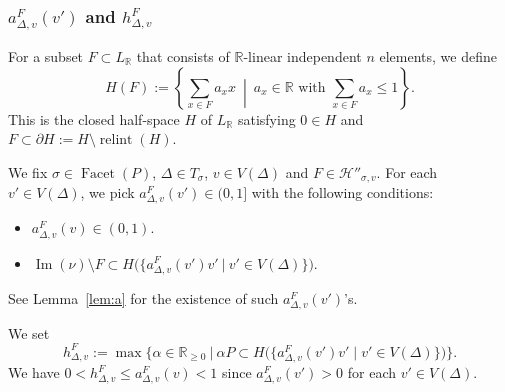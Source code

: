 \subsubsection{$a^{F} _{\Delta, v} (v')$ and $h^F_{\Delta, v}$}\label{subsubsection:ah}
\begin{defn}\label{defi:ah}
For a subset $F \subset L_{\mathbb{R}}$ that consists of $\mathbb{R}$-linear independent $n$ elements, 
we define 
\[
H(F) := \left \{ \sum _{x \in F} a_x x \ \middle | \ \text{$a_x \in \mathbb{R}$ with $\sum_{x \in F} a_x \le 1$} \right \}. 
\]
This is the closed half-space $H$ of $L_{\mathbb{R}}$ satisfying $0 \in H$ and $F \subset \partial H := H \setminus \operatorname{relint}(H)$. 
\end{defn}

We fix $\sigma \in \operatorname{Facet}(P)$, $\Delta \in T_{\sigma}$, $v \in V(\Delta)$ and $F \in \mathcal{H}'' _{\sigma, v}$. 
For each $v' \in V(\Delta)$, 
we pick $a^{F} _{\Delta, v} (v') \in (0,1]$ with the following conditions: 
\begin{itemize}
\item[(A1)] 
$a^{F} _{\Delta, v} (v) \in (0,1)$. 

\item[(A2)]
$\operatorname{Im}(\nu) \setminus F \subset H \bigl( \bigl \{ a^{F} _{\Delta, v} (v') v' \ \big | \  v' \in V(\Delta) \bigr \} \bigr)$. 
\end{itemize}
See Lemma~\ref{lem:a} for the existence of such $a^{F} _{\Delta, v} (v')$'s. 

We set
\[\tag{H}
h^F_{\Delta, v} := \max \bigl \{ \alpha \in \mathbb{R}_{\ge 0} \ \big | \ 
\alpha P \subset 
H \bigl( \bigl \{ a^{F} _{\Delta, v} (v') v' \mid v' \in V(\Delta) \bigr \} \bigr) \bigr \}. 
\]
We have $0 < h^F_{\Delta, v} \le a^{F} _{\Delta, v} (v) < 1$ since $a^{F} _{\Delta, v} (v') > 0$ for each $v' \in V(\Delta)$. 

